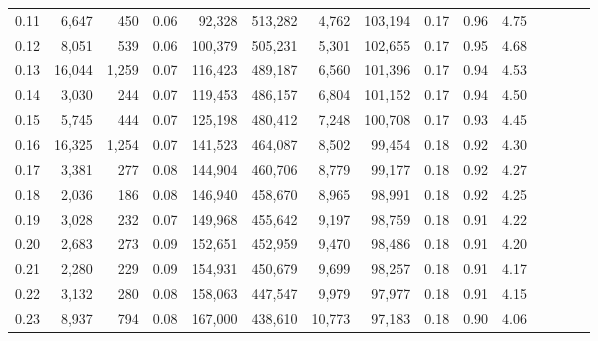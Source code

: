 \begin{tabular}{rrrcrrrrrrrrrrr}
0.11 &   6,647 &    450 &                                       0.06 &   92,328 &  513,282 &    4,762 &  103,194 &  0.17 &  0.96 &                         4.75 \\
0.12 &   8,051 &    539 &                                       0.06 &  100,379 &  505,231 &    5,301 &  102,655 &  0.17 &  0.95 &                         4.68 \\
0.13 &  16,044 &  1,259 &                                       0.07 &  116,423 &  489,187 &    6,560 &  101,396 &  0.17 &  0.94 &                         4.53 \\
0.14 &   3,030 &    244 &                                       0.07 &  119,453 &  486,157 &    6,804 &  101,152 &  0.17 &  0.94 &                         4.50 \\
0.15 &   5,745 &    444 &                                       0.07 &  125,198 &  480,412 &    7,248 &  100,708 &  0.17 &  0.93 &                         4.45 \\
0.16 &  16,325 &  1,254 &                                       0.07 &  141,523 &  464,087 &    8,502 &   99,454 &  0.18 &  0.92 &                         4.30 \\
0.17 &   3,381 &    277 &                                       0.08 &  144,904 &  460,706 &    8,779 &   99,177 &  0.18 &  0.92 &                         4.27 \\
0.18 &   2,036 &    186 &                                       0.08 &  146,940 &  458,670 &    8,965 &   98,991 &  0.18 &  0.92 &                         4.25 \\
0.19 &   3,028 &    232 &                                       0.07 &  149,968 &  455,642 &    9,197 &   98,759 &  0.18 &  0.91 &                         4.22 \\
0.20 &   2,683 &    273 &                                       0.09 &  152,651 &  452,959 &    9,470 &   98,486 &  0.18 &  0.91 &                         4.20 \\
0.21 &   2,280 &    229 &                                       0.09 &  154,931 &  450,679 &    9,699 &   98,257 &  0.18 &  0.91 &                         4.17 \\
0.22 &   3,132 &    280 &                                       0.08 &  158,063 &  447,547 &    9,979 &   97,977 &  0.18 &  0.91 &                         4.15 \\
0.23 &   8,937 &    794 &                                       0.08 &  167,000 &  438,610 &   10,773 &   97,183 &  0.18 &  0.90 &                         4.06 \\

\end{tabular}
